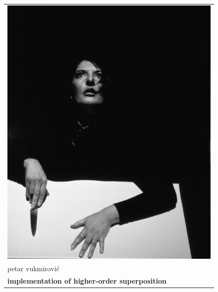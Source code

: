 \thispagestyle{empty}
\addtocounter{page}{-1}


    \begin{figure}[p]
        \centering
        \begin{tabular}[t]{l}
            \includegraphics[width=\widthof{\textsf{\textbf{\Large implementation of higher-order superposition}}}]{cover/rythm-10.jpg} \\[2\jot]
            \textsf{\large petar vukmirović} \\[\jot]
            \textsf{\textbf{\Large implementation of higher-order superposition}}
        \end{tabular}
    \end{figure}
   
